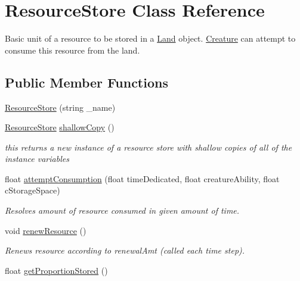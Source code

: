 \hypertarget{class_resource_store}{}\section{Resource\+Store Class Reference}
\label{class_resource_store}


Basic unit of a resource to be stored in a \mbox{\hyperlink{class_land}{Land}} object. \mbox{\hyperlink{class_creature}{Creature}} can attempt to consume this resource from the land.  


\subsection*{Public Member Functions}
\begin{DoxyCompactItemize}
\item 
\mbox{\hyperlink{class_resource_store_aa9d9ff044e6156590656f1471b6d3e7d}{Resource\+Store}} (string \+\_\+name)
\item 
\mbox{\hyperlink{class_resource_store}{Resource\+Store}} \mbox{\hyperlink{class_resource_store_a7a609776888726de6169f1e9b90dd36f}{shallow\+Copy}} ()
\begin{DoxyCompactList}\small\item\em this returns a new instance of a resource store with shallow copies of all of the instance variables \end{DoxyCompactList}\item 
float \mbox{\hyperlink{class_resource_store_a0a779526593c2dab8e6b9d9e4d5013e6}{attempt\+Consumption}} (float time\+Dedicated, float creature\+Ability, float c\+Storage\+Space)
\begin{DoxyCompactList}\small\item\em Resolves amount of resource consumed in given amount of time. \end{DoxyCompactList}\item 
void \mbox{\hyperlink{class_resource_store_a9c37fdfe13469bed6232c3ed1418d313}{renew\+Resource}} ()
\begin{DoxyCompactList}\small\item\em Renews resource according to renewal\+Amt (called each time step). \end{DoxyCompactList}\item 
float \mbox{\hyperlink{class_resource_store_aa3b1414c69c413330e41fc53b32563ca}{get\+Proportion\+Stored}} ()
\end{DoxyCompactItemize}
